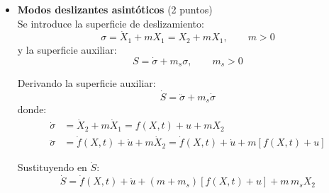 \begin{enumerate}
\begin{itemize}
        Se define la función de conmutación:
        \begin{equation*}
            V_{e\theta} = L_a + n_a|\dot{\theta}| + n_a|e_\theta|
        \end{equation*}
        con $L_a>0$ una cota positiva de la perturbación en el lazo de actitud. La ley de control es:
        \begin{equation*}
            \tau = K_a\,V_{e\theta}\,\operatorname{sat}(\sigma_\theta)
        \end{equation*}

        Siguiendo el mismo procedimiento que en el lazo externo, la derivada de la función de Lyapunov $V_\theta = \tfrac{1}{2}\sigma_\theta^2$ satisface:
        \begin{equation*}
            \dot{V}_\theta \le -(K_a-1)V_{e\theta}|\sigma_\theta|
        \end{equation*}
        por lo que si $K_a>1$, el error de actitud $e_\theta\to 0$ y en consecuencia $\theta\to\theta_d$.

       \item \textbf{Modos deslizantes asintóticos} (2 puntos) \\

        Se introduce la superficie de deslizamiento:
        \begin{equation*}
            \sigma = \dot{X}_1 + m X_1 = X_2 + m X_1,\qquad m>0
        \end{equation*}
        y la superficie auxiliar:
        \begin{equation*}
            S = \dot{\sigma} + m_s \sigma,\qquad m_s>0
        \end{equation*}

        Derivando la superficie auxiliar:
        \begin{equation*}
            \dot{S} = \ddot{\sigma} + m_s\dot{\sigma}
        \end{equation*}
        donde:
        \begin{equation*}
            \begin{aligned}
                \dot{\sigma} &= \dot{X}_2 + m\dot{X}_1 = f(X,t) + u + mX_2 \\
                \ddot{\sigma} &= \dot{f}(X,t) + \dot{u} + m\dot{X}_2 = \dot{f}(X,t) + \dot{u} + m[f(X,t) + u]
            \end{aligned}
        \end{equation*}

        Sustituyendo en $\dot{S}$:
        \begin{equation*}
            \dot{S} = \dot{f}(X,t) + \dot{u} + (m + m_s)[f(X,t) + u] + m\,m_s X_2
        \end{equation*}


\end{itemize}
\end{enumerate}
